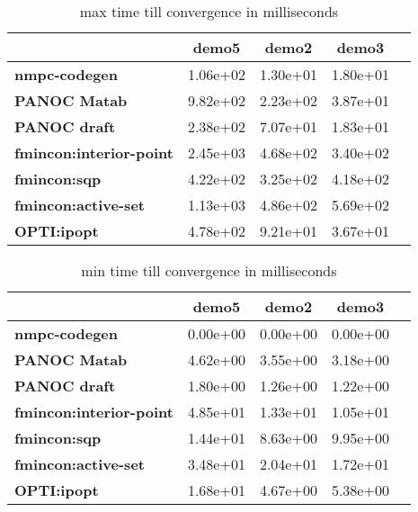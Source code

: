 \begin{table}[H]
	\centering
	\begin{tabular}{|l|c|c|c|c|}
		\hline
		&\textbf{demo5}&\textbf{demo2}&\textbf{demo3}\\\hline
		\textbf{nmpc-codegen}&1.06e+02&1.30e+01&1.80e+01\\\hline
		\textbf{PANOC Matab}&9.82e+02&2.23e+02&3.87e+01\\\hline
		\textbf{PANOC draft}&2.38e+02&7.07e+01&1.83e+01\\\hline
		\textbf{fmincon:interior-point}&2.45e+03&4.68e+02&3.40e+02\\\hline
		\textbf{fmincon:sqp}&4.22e+02&3.25e+02&4.18e+02\\\hline
		\textbf{fmincon:active-set}&1.13e+03&4.86e+02&5.69e+02\\\hline
		\textbf{OPTI:ipopt}&4.78e+02&9.21e+01&3.67e+01\\\hline
	\end{tabular}
	\caption{max time till convergence in milliseconds}
	\label{tbl:max time till convergence with noise}
\end{table}

\begin{table}[H]
	\centering
	\begin{tabular}{|l|	c|c|c|c|}
		\hline
		&\textbf{demo5}&\textbf{demo2}&\textbf{demo3}\\\hline
		\textbf{nmpc-codegen}&0.00e+00&0.00e+00&0.00e+00\\\hline
		\textbf{PANOC Matab}&4.62e+00&3.55e+00&3.18e+00\\\hline
		\textbf{PANOC draft}&1.80e+00&1.26e+00&1.22e+00\\\hline
		\textbf{fmincon:interior-point}&4.85e+01&1.33e+01&1.05e+01\\\hline
		\textbf{fmincon:sqp}&1.44e+01&8.63e+00&9.95e+00\\\hline
		\textbf{fmincon:active-set}&3.48e+01&2.04e+01&1.72e+01\\\hline
		\textbf{OPTI:ipopt}&1.68e+01&4.67e+00&5.38e+00\\\hline
	\end{tabular}
	\caption{min time till convergence in milliseconds}
	\label{tbl:min time till convergence with noise}
\end{table}